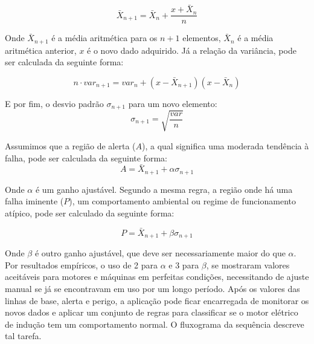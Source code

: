 \begin{equation}\label{eq:ml}
    \bar{X}_{n+1} = \bar{X}_{n} + \frac{x + \bar{X}_n}{n}
\end{equation}

Onde $\bar{X}_{n+1}$ é a média aritmética para os $n+1$ elementos, $ \bar{X}_{n}$ é a média aritmética anterior,
$x$ é o novo dado adquirido. Já a relação da variância, pode ser calculada da seguinte forma:


\begin{equation}\label{eq:ml2}
    n \cdot var_{n+1} = var_{n} + (x - \bar{X}_{n+1})(x-\bar{X}_n)
\end{equation}

E por fim, o desvio padrão $\sigma_{n+1}$ para um novo elemento:
\begin{equation}\label{eq:ml3}
    \sigma_{n+1} = \sqrt{\frac{var}{n}}
\end{equation}

Assumimos que a região de alerta ($A$), a qual significa uma moderada tendência à falha, pode ser calculada da seguinte forma: 
\begin{equation}\label{eq:ml4}
    A = \bar{X}_{n+1} + \alpha \sigma_{n+1} 
\end{equation}

Onde $\alpha$ é um ganho ajustável. Segundo a mesma regra, a região onde há uma falha iminente ($P$), um comportamento ambiental ou regime de funcionamento atípico, 
pode ser calculado da seguinte forma:

\begin{equation}\label{eq:ml5}
    P = \bar{X}_{n+1} + \beta \sigma_{n+1} 
\end{equation}

Onde $\beta$ é outro ganho ajustável, que deve ser necessariamente maior do que $\alpha$. Por resultados empíricos, o uso de 2 para $\alpha$ e 
3 para $\beta$, se mostraram valores aceitáveis para motores e máquinas em perfeitas condições, necessitando de ajuste manual se já se encontravam
em uso por um longo período. Após os valores das linhas de base, alerta e perigo, a aplicação pode ficar encarregada de monitorar os novos dados e aplicar um conjunto
de regras para classificar se o motor elétrico de indução tem um comportamento normal. O fluxograma da sequência descreve tal tarefa.

